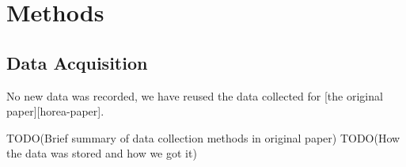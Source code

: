 \section{Methods}

\subsection{Data Acquisition}

No new data was recorded, we have reused the data collected for [the
original paper][horea-paper].

TODO(Brief summary of data collection methods in original paper)
TODO(How the data was stored and how we got it)

